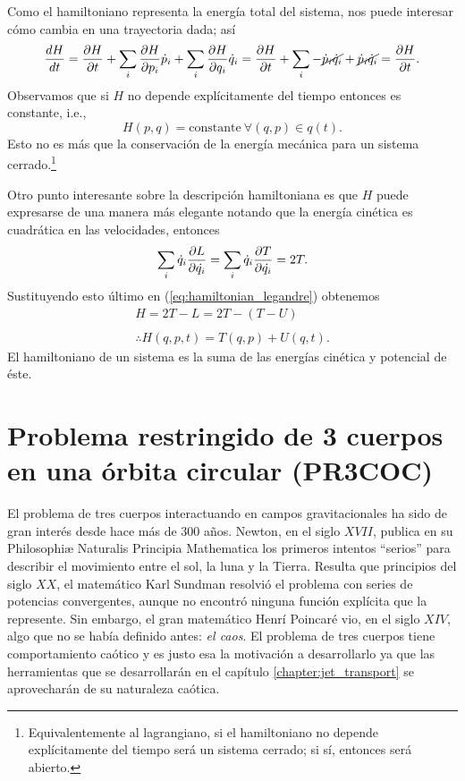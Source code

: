 Como el hamiltoniano representa la energía total del sistema, nos puede interesar cómo cambia en una trayectoria dada; así 
\begin{equation*}
 \frac{dH}{dt} = \frac{\partial H}{\partial t} + \sum_i \frac{\partial H}{\partial p_i}\dot{p}_i + \sum_i \frac{\partial H}{\partial q_i}\dot{q}_i = \frac{\partial H}{\partial t} + \sum_i - \cancel{\dot{p}_i\dot{q}_i} + \cancel{\dot{p}_i\dot{q}_i} = \frac{\partial H}{\partial t}.
\end{equation*}
Observamos que si $H$ no depende explícitamente del tiempo entonces es constante, i.e.,
\begin{equation*}
 H(p,q) = \text{constante} \ \forall (q,p) \in q(t).
\end{equation*} Esto no es más que la conservación de la energía mecánica para un sistema cerrado.\footnote{Equivalentemente al lagrangiano, si el hamiltoniano no depende explícitamente del tiempo será un sistema cerrado; si sí, entonces será abierto.}

Otro punto interesante sobre la descripción hamiltoniana es que $H$ puede expresarse de una manera más elegante notando que la energía cinética es cuadrática en las velocidades, entonces
\begin{align*}
 \sum_i \dot{q}_i \frac{\partial L}{\partial \dot{q_i}} = \sum_i \dot{q}_i \frac{\partial T}{\partial \dot{q_i}} = 2 T.
\end{align*}
Sustituyendo esto último en (\ref{eq:hamiltonian_legandre}) obtenemos
\begin{align}
 H = 2T - L = 2T - \left( T - U \right) \nonumber \\ 
 \nonumber \\
 \therefore H(q,p,t) = T(q,p) + U(q,t).
 \label{eq:hamiltonian}
\end{align}
El hamiltoniano de un sistema es la suma de las energías cinética y potencial de éste. 

\section{Problema restringido de 3 cuerpos en una órbita circular (PR3COC)}

El problema de tres cuerpos interactuando en campos gravitacionales ha sido de gran interés desde hace más de 300 años. Newton, en el siglo $XVII$, publica en su Philosophiæ Naturalis Principia Mathematica \cite{Principia} los primeros intentos ``serios'' para describir el movimiento entre el sol, la luna y la Tierra. Resulta que principios del siglo $XX$, el matemático Karl Sundman resolvió el problema con series de potencias convergentes, aunque no encontró ninguna función explícita que la represente. Sin embargo, el gran matemático Henrí Poincaré vio, en el siglo $XIV$, algo que no se había definido antes: \textit{el caos}. El problema de tres cuerpos tiene comportamiento caótico y es justo esa la motivación a desarrollarlo ya que las herramientas que se desarrollarán en el capítulo \ref{chapter:jet_transport} se aprovecharán de su naturaleza caótica. 


